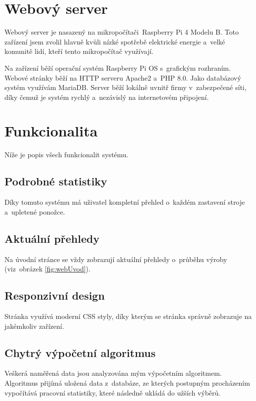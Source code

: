 \documentclass{template/socthesis}
\begin{document}

\section{Webový server}
Webový server je nasazený na mikropočítači~Raspberry Pi 4 Modelu B.
Toto zařízení jsem zvolil hlavně kvůli nízké spotřebě elektrické energie a~velké komunitě lidí, kteří tento mikropočítač využívají.

Na zařízení běží operační systém Raspberry Pi OS s~grafickým rozhraním.
Webové stránky běží na HTTP serveru Apache2 a~PHP 8.0.
Jako databázový systém využívám MariaDB.
Server běží lokálně uvnitř firmy v~zabezpečené síti, díky čemuž je systém rychlý a~nezávislý na internetovém připojení.


\section{Funkcionalita}
Níže je popis všech funkcionalit systému.


\subsection{Podrobné statistiky}
Díky tomuto systému má uživatel kompletní přehled o~každém zastavení stroje a~upletené ponožce.


\subsection{Aktuální přehledy}
Na úvodní stránce se vždy zobrazují aktuální přehledy o~průběhu výroby (viz~obrázek \ref{fig:webUvod}).


\subsection{Responzivní design}
Stránka využívá moderní CSS styly, díky kterým se stránka správně zobrazuje na jakémkoliv zařízení. 


\subsection{Chytrý výpočetní algoritmus}
Veškerá naměřená data jsou analyzována mým výpočetním algoritmem.
Algoritmus přijímá uložená data z~databáze, ze kterých postupným procházením vypočítává pracovní statistiky, které následně ukládá do užších výběrů.
\end{document}
